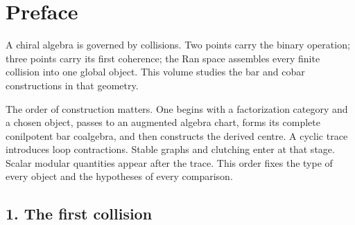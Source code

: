 \providecommand{\cZ}{\mathcal{Z}}
\providecommand{\cA}{\mathcal{A}}
\providecommand{\barB}{\overline{B}}
\providecommand{\gAmod}{\mathfrak{g}_{\cA}^{\mathrm{mod}}}
\providecommand{\MC}{\operatorname{MC}}
\providecommand{\cM}{\mathcal{M}}
\providecommand{\cC}{\mathcal{C}}
\providecommand{\cO}{\mathcal{O}}
\providecommand{\cP}{\mathcal{P}}
\providecommand{\Eone}{E_1}
\providecommand{\Convinf}{\operatorname{Conv}_\infty}
\providecommand{\Convstr}{\operatorname{Conv}_{\mathrm{str}}}
\providecommand{\orline}[1]{\operatorname{or}(#1)}
\providecommand{\fg}{\mathfrak{g}}
\providecommand{\Defcyc}{\operatorname{Def}_{\mathrm{cyc}}}
\providecommand{\Rep}{\operatorname{Rep}}
\providecommand{\Etwo}{\mathsf{E}_{2}}
\providecommand{\Ethree}{\mathsf{E}_{3}}
\providecommand{\Einf}{\mathsf{E}_{\infty}}
\providecommand{\En}{\mathsf{E}_{n}}
\providecommand{\ChirAlg}{\operatorname{ChirAlg}}
\providecommand{\HTQFT}{\operatorname{HT\text{-}QFT}}
\providecommand{\Phihol}{\Phi_{\mathrm{hol}}}
\providecommand{\Phicy}{\Phi_{\mathrm{CY}}}
\providecommand{\GRTone}{\operatorname{GRT}_{1}}
\providecommand{\kBKM}{\kappa_{\mathrm{BKM}}}
\providecommand{\kch}{\kappa_{\mathrm{ch}}}
\providecommand{\kfib}{\kappa_{\mathrm{fiber}}}
\providecommand{\kcat}{\kappa_{\mathrm{cat}}}
\providecommand{\Face}{\operatorname{Face}}
\providecommand{\gAE}{\mathfrak{g}_{\cA}^{E_{1}}}
\providecommand{\bE}{\mathbb{E}}

\chapter*{Preface}
\label{ch:preface}

A chiral algebra is governed by collisions.  Two points carry the
binary operation; three points carry its first coherence; the Ran
space assembles every finite collision into one global object.  This
volume studies the bar and cobar constructions in that geometry.

The order of construction matters.  One begins with a factorization
category and a chosen object, passes to an augmented algebra chart,
forms its complete conilpotent bar coalgebra, and then constructs the
derived centre.  A cyclic trace introduces loop contractions.  Stable
graphs and clutching enter at that stage.  Scalar modular quantities
appear after the trace.  This order fixes the type of every object and
the hypotheses of every comparison.

\section*{1.  The first collision}

